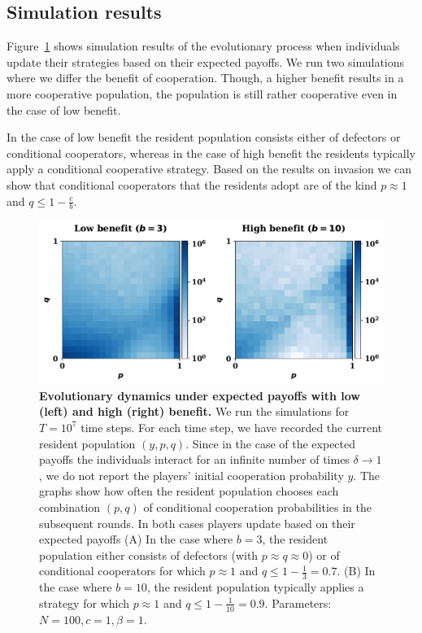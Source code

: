 \documentclass[11pt]{article}
\theoremstyle{plainCl1}
\theoremstyle{plainCl2}
\begin{document}
\subsection{Simulation results}\label{section:simulation_results_exprected}

Figure~\ref{fig:expected_payoffs_results} shows simulation results of the
evolutionary process when individuals update their strategies based on their
expected payoffs. We run two simulations where we differ the benefit of
cooperation. Though, a higher benefit results in a more cooperative population,
the population is still rather cooperative even in the case of low benefit.

In the case of low benefit the resident population consists either of defectors
or conditional cooperators, whereas in the case of high benefit the residents
typically apply a conditional cooperative strategy. Based on the results on
invasion we can show that conditional cooperators that the residents adopt are
of the kind \(p \approx 1\) and \(q \leq 1 - \frac{c}{b}\).

\begin{figure}[!htbp]
    \centering 
    \includegraphics[width=.70\textwidth]{../static/expected_payoffs_donation_game.pdf}
    \caption{\textbf{Evolutionary dynamics under expected payoffs with
    low (left) and high (right) benefit.} We run the simulations for \(T =
    10^7\) time steps. For each time step, we have recorded the current resident
    population \((y, p, q)\). Since in the case of the expected payoffs the
    individuals interact for an infinite number of times \(\delta \rightarrow
    1\), we do not report the players' initial cooperation probability \(y\).
    The graphs show how often the resident population chooses each combination
    \((p, q)\) of conditional cooperation probabilities in the subsequent
    rounds. In both cases players update based on their expected payoffs (A) In
    the case where \(b=3\), the resident population either consists of defectors
    (with \(p \approx q \approx 0\)) or of conditional cooperators for which \(p
    \approx 1\) and \(q \leq 1 - \frac{1}{3}=0.7\). (B) In the case where
    \(b=10\), the resident population typically applies a strategy for which \(p
    \approx 1\) and \(q \leq 1 - \frac{1}{10}=0.9\). Parameters: \(N =100, c=1,
    \beta=1\).
    }\label{fig:expected_payoffs_results}
\end{figure}
\end{document}

